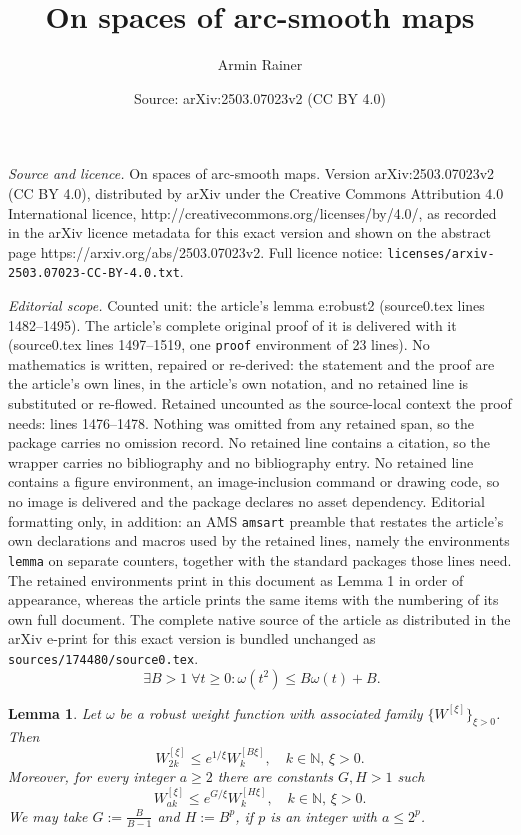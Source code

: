\documentclass[10pt,a4paper]{amsart}
\title{On spaces of arc-smooth maps}
\author{Armin Rainer}
\date{Source: arXiv:2503.07023v2 (CC BY 4.0)}
\newtheorem{lemma}{Lemma}
\def\A{\;\forall}
\def\E{\;\exists}
\def\N{\mathbb{N}}
\def\om{\omega}
\begin{document}
\maketitle

\noindent\emph{Source and licence.} On spaces of arc-smooth maps. Version arXiv:2503.07023v2 (CC BY 4.0), distributed by arXiv under the Creative Commons Attribution 4.0 International licence, http://creativecommons.org/licenses/by/4.0/, as recorded in the arXiv licence metadata for this exact version and shown on the abstract page https://arxiv.org/abs/2503.07023v2. Full licence notice: \texttt{licenses/arxiv-2503.07023-CC-BY-4.0.txt}.\par\smallskip

\noindent\textit{Editorial scope.} Counted unit: the article's lemma e:robust2 (source0.tex lines 1482--1495). The article's complete original proof of it is delivered with it (source0.tex lines 1497--1519, one \texttt{proof} environment of 23 lines). No mathematics is written, repaired or re-derived: the statement and the proof are the article's own lines, in the article's own notation, and no retained line is substituted or re-flowed.  Retained uncounted as the source-local context the proof needs: lines 1476--1478.  Nothing was omitted from any retained span, so the package carries no omission record.  No retained line contains a citation, so the wrapper carries no bibliography and no bibliography entry.  No retained line contains a figure environment, an image-inclusion command or drawing code, so no image is delivered and the package declares no asset dependency.  Editorial formatting only, in addition: an AMS \texttt{amsart} preamble that restates the article's own declarations and macros used by the retained lines, namely the environments \texttt{lemma} on separate counters, together with the standard packages those lines need.  The retained environments print in this document as Lemma 1 in order of appearance, whereas the article prints the same items with the numbering of its own full document.  The complete native source of the article as distributed in the arXiv e-print for this exact version is bundled unchanged as \texttt{sources/174480/source0.tex}.
    \begin{equation} \label{e:robust}
        \E B> 1 \A t \ge 0: \om(t^2) \le B \om(t) + B.
    \end{equation}

\begin{lemma}
    Let $\om$ be a robust weight function with associated family $\{W^{[\xi]}\}_{\xi>0}$.
    Then 
    \begin{equation} \label{e:robust2}
        W^{[\xi]}_{2k} \le e^{1/\xi} W^{[B\xi]}_k, \quad k \in \N,\, \xi >0.
    \end{equation}
    Moreover,
    for every integer $a\ge 2$ there are constants $G,H> 1$ such
    \begin{equation} \label{e:robust3}
        W^{[\xi]}_{ak} \le e^{G/\xi} W^{[H\xi]}_k, \quad k \in \N,\, \xi >0.
    \end{equation}
    We may take $G:= \tfrac{B}{B-1}$ and $H := B^p$, 
    if $p$ is an integer with $a \le 2^p$.
\end{lemma}
\end{document}
